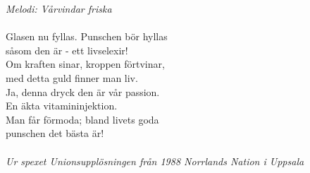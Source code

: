 {\footnotesize\textit{Melodi: Vårvindar friska}}\\
\\
Glasen nu fyllas. Punschen bör hyllas\\
såsom den är - ett livselexir!\\
Om kraften sinar, kroppen förtvinar,\\
med detta guld finner man liv.\\
Ja, denna dryck den är vår passion.\\
En äkta vitamininjektion.\\
Man får förmoda; bland livets goda\\
punschen det bästa är!\\
\\
{\footnotesize\textit{Ur spexet Unionsupplösningen från 1988 Norrlands Nation i Uppsala}}
